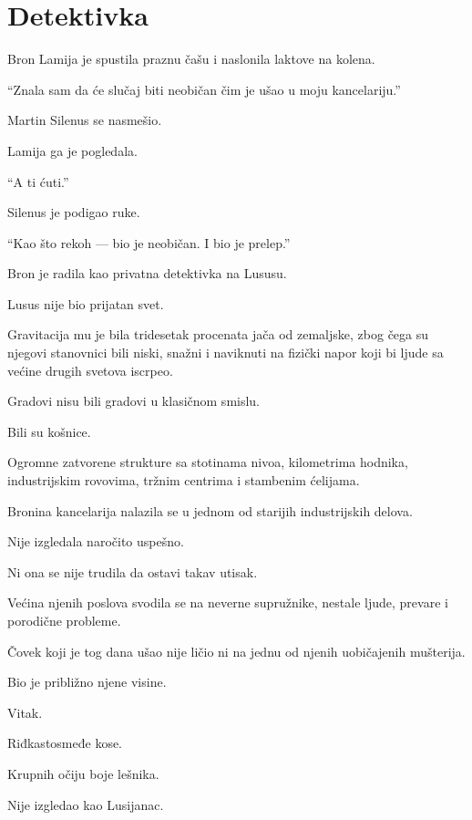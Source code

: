 \chapter{Detektivka}


Bron Lamija je spustila praznu čašu i naslonila laktove na kolena.

``Znala sam da će slučaj biti neobičan čim je ušao u moju kancelariju.''

Martin Silenus se nasmešio.

Lamija ga je pogledala.

``A ti ćuti.''

Silenus je podigao ruke.

``Kao što rekoh --- bio je neobičan. I bio je prelep.''

\bigskip

Bron je radila kao privatna detektivka na Lususu.

Lusus nije bio prijatan svet.

Gravitacija mu je bila tridesetak procenata jača od zemaljske, zbog čega su njegovi stanovnici bili niski, snažni i naviknuti na fizički napor koji bi ljude sa većine drugih svetova iscrpeo.

Gradovi nisu bili gradovi u klasičnom smislu.

Bili su košnice.

Ogromne zatvorene strukture sa stotinama nivoa, kilometrima hodnika, industrijskim rovovima, tržnim centrima i stambenim ćelijama.

Bronina kancelarija nalazila se u jednom od starijih industrijskih delova.

Nije izgledala naročito uspešno.

Ni ona se nije trudila da ostavi takav utisak.

Većina njenih poslova svodila se na neverne supružnike, nestale ljude, prevare i porodične probleme.

Čovek koji je tog dana ušao nije ličio ni na jednu od njenih uobičajenih mušterija.

Bio je približno njene visine.

Vitak.

Riđkastosmeđe kose.

Krupnih očiju boje lešnika.

Nije izgledao kao Lusijanac.

